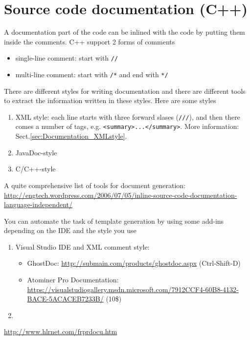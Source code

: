
\chapter{Source code documentation (C++)}
\label{chap:source-code-docum}


A documentation part of the code can be inlined with the code by putting them
inside the comments. C++ support 2 forms of comments
\begin{itemize}
  \item single-line comment: start with \verb!//!
  \item multi-line comment: start with \verb!/*! and end with \verb!*/!
  
\end{itemize}

There are different styles for writing documentation and there are different
tools to extract the information written in these styles. Here are some styles
\begin{enumerate}
  \item XML style: each line starts with three forward slases (\verb!///!), and
  then there comes a number of tags, e.g. \verb!<summary>...</summary>!. More
  information: Sect.\ref{sec:Documentation_XMLstyle}.
    
  \item JavaDoc-style
  \item C/C++-style
\end{enumerate}

A quite comprehensive list of tools for document generation:
\url{http://engtech.wordpress.com/2006/07/05/inline-source-code-documentation-language-independent/}

You can automate the task of template generation by using some add-ins depending
on the IDE and the style you use
\begin{enumerate}
  \item Visual Studio IDE and XML comment style:
  \begin{itemize}
    \item GhostDoc: \url{http://submain.com/products/ghostdoc.aspx}
    (Ctrl-Shift-D)
    \item Atominer Pro Documentation:
    \url{https://visualstudiogallery.msdn.microsoft.com/7912CCF4-60B8-4132-BACE-5ACACEB7233B/}
    (10\$)
  \end{itemize} 
  \item 
\end{enumerate}
\url{http://www.hlrnet.com/frprdocu.htm}


